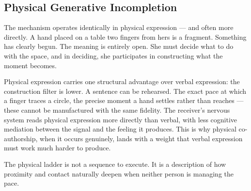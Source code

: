 \subsection{Physical Generative Incompletion}

The mechanism operates identically in physical expression --- and often 
more directly. A hand placed on a table two fingers from hers is a fragment. 
Something has clearly begun. The meaning is entirely open. She must decide 
what to do with the space, and in deciding, she participates in constructing 
what the moment becomes.

Physical expression carries one structural advantage over verbal expression: 
the construction filter is lower. A sentence can be rehearsed. The exact pace 
at which a finger traces a circle, the precise moment a hand settles rather 
than reaches --- these cannot be manufactured with the same fidelity. 
The receiver's nervous system reads physical expression more directly than 
verbal, with less cognitive mediation between the signal and the feeling 
it produces. This is why physical co-authorship, when it occurs genuinely, 
lands with a weight that verbal expression must work much harder to produce.

The physical ladder is not a sequence to execute. It is a description of 
how proximity and contact naturally deepen when neither person is managing 
the pace.

